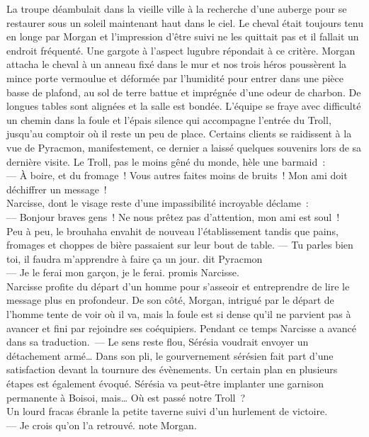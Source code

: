\documentclass[french, a4paper, 12pt]{article}
\begin{document}
La troupe déambulait dans la vieille ville à la recherche d'une auberge pour se restaurer sous un soleil maintenant haut dans le ciel. Le cheval était toujours tenu en longe par Morgan et l'impression d'être suivi ne les quittait pas et il fallait un endroit fréquenté. Une gargote à l'aspect lugubre répondait à ce critère. Morgan attacha le cheval à un anneau fixé dans le mur et nos trois héros poussèrent la mince porte vermoulue et déformée par l'humidité pour entrer dans une pièce basse de plafond, au sol de terre battue et imprégnée d'une odeur de charbon. De longues tables sont alignées et la salle est bondée. L'équipe se fraye avec difficulté un chemin dans la foule et l'épais silence qui accompagne l'entrée du Troll, jusqu'au comptoir où il reste un peu de place. Certains clients se raidissent à la vue de Pyracmon, manifestement, ce dernier a laissé quelques souvenirs lors de sa dernière visite. Le Troll, pas le moins gêné du monde, hèle une barmaid~:\\
--- À boire, et du fromage~! Vous autres faites moins de bruits~! Mon ami doit déchiffrer un message~!\\
Narcisse, dont le visage reste d'une impassibilité incroyable déclame~:\\
--- Bonjour braves gens~! Ne nous prêtez pas d'attention, mon ami est soul~!\\
Peu à peu, le brouhaha envahit de nouveau l'établissement tandis que pains, fromages et choppes de bière passaient sur leur bout de table.
--- Tu parles bien toi, il faudra m'apprendre à faire ça un jour. dit Pyracmon\\
--- Je le ferai mon garçon, je le ferai. promis Narcisse.\\
Narcisse profite du départ d'un homme pour s'asseoir et entreprendre de lire le message plus en profondeur. De son côté, Morgan, intrigué par le départ de l'homme tente de voir où il va, mais la foule est si dense qu'il ne parvient pas à avancer et fini par rejoindre ses coéquipiers. Pendant ce temps Narcisse a avancé dans sa traduction.\
--- Le sens reste flou, Sérésia voudrait envoyer un détachement armé… Dans son pli, le gourvernement sérésien fait part d'une satisfaction devant la tournure des évènements. Un certain plan en plusieurs étapes est également évoqué. Sérésia va peut-être implanter une garnison permanente à Boisoi, mais… Où est passé notre Troll~?\\
Un lourd fracas ébranle la petite taverne suivi d'un hurlement de victoire.\\
--- Je crois qu'on l'a retrouvé. note Morgan.\\
\end{document}
